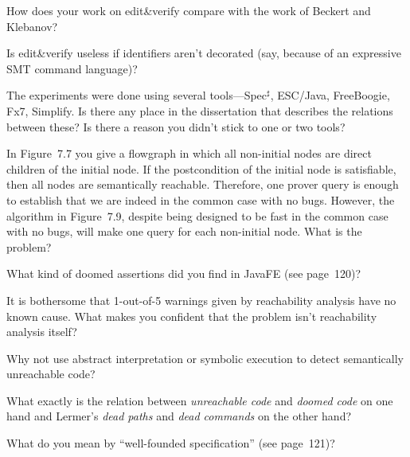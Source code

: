 
\Q How does your work on edit\&verify compare with the work of Beckert and
Klebanov?

\Q Is edit\&verify useless if identifiers aren't decorated (say, because of
an expressive SMT command language)?

\Q The experiments were done using several tools---Spec$^\sharp$, ESC/Java,
FreeBoogie, Fx7, Simplify. Is there any place in the dissertation that
describes the relations between these? Is there a reason you didn't stick
to one or two tools?

\Q In Figure~7.7 you give a flowgraph in which all non-initial nodes are
direct children of the initial node. If the postcondition of the initial
node is satisfiable, then all nodes are semantically reachable. Therefore,
one prover query is enough to establish that we are indeed in the common
case with no bugs. However, the algorithm in Figure~7.9, despite being
designed to be fast in the common case with no bugs, will make one query
for each non-initial node. What is the problem?


\Q What kind of doomed assertions did you find in JavaFE (see page~120)?

\Q It is bothersome that 1-out-of-5 warnings given by reachability analysis
have no known cause. What makes you confident that the problem isn't
reachability analysis itself?

\Q Why not use abstract interpretation or symbolic execution to detect
semantically unreachable code?


\Q What exactly is the relation between {\it unreachable code\/} and {\it
doomed code\/} on one hand and Lermer's {\it dead paths\/} and {\it dead
commands\/} on the other hand?

\Q What do you mean by ``well-founded specification'' (see page~121)?

\bye
